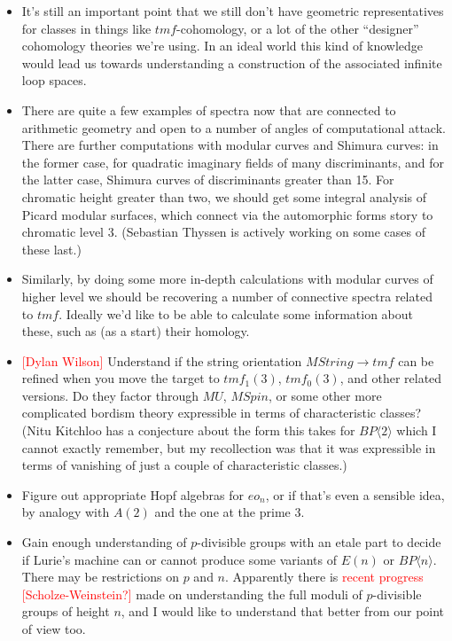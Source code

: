 \documentclass[12pt,titlepage]{article}
\newcommand{\rd}[1]{{\textcolor{red}{#1}}}
\theoremstyle{plain}
\theoremstyle{definition}
\theoremstyle{remark}
\begin{document}
\begin{itemize}%
\item It'{}s still an important point that we still don'{}t have geometric representatives for classes in things like $tmf$-cohomology, or a lot of the other ``{}designer''{} cohomology theories we'{}re using. In an ideal world this kind of knowledge would lead us towards understanding a construction of the associated infinite loop spaces.


\item There are quite a few examples of spectra now that are connected to arithmetic geometry and open to a number of angles of computational attack. There are further computations with modular curves and Shimura curves: in the former case, for quadratic imaginary fields of many discriminants, and for the latter case, Shimura curves of discriminants greater than 15. For chromatic height greater than two, we should get some integral analysis of Picard modular surfaces, which connect via the automorphic forms story to chromatic level 3. (Sebastian Thyssen is actively working on some cases of these last.)


\item Similarly, by doing some more in-depth calculations with modular curves of higher level we should be recovering a number of connective spectra related to $tmf$. Ideally we'{}d like to be able to calculate some information about these, such as (as a start) their homology.


\item \rd{[Dylan Wilson]} Understand if the string orientation $MString \to tmf$ can be refined when you move the target to $tmf_1(3)$, $tmf_0(3)$, and other related versions. Do they factor through $MU$, $MSpin$, or some other more complicated bordism theory expressible in terms of characteristic classes? (Nitu Kitchloo has a conjecture about the form this takes for $BP\langle 2\rangle$ which I cannot exactly remember, but my recollection was that it was expressible in terms of vanishing of just a couple of characteristic classes.)


\item Figure out appropriate Hopf algebras for $eo_n$, or if that'{}s even a sensible idea, by analogy with $A(2)$ and the one at the prime $3$.


\item Gain enough understanding of $p$-divisible groups with an etale part to decide if Lurie'{}s machine can or cannot produce some variants of $E(n)$ or $BP\langle n\rangle$. There may be restrictions on $p$ and $n$. Apparently there is \rd{recent progress [Scholze-Weinstein?]} made on understanding the full moduli of $p$-divisible groups of height $n$, and I would like to understand that better from our point of view too.



\end{itemize}
\end{document}
